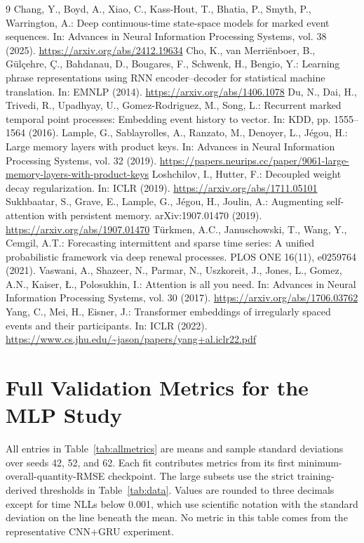 \documentclass[runningheads]{llncs}
\begin{document}
\begin{thebibliography}{9}
Chang, Y., Boyd, A., Xiao, C., Kass-Hout, T., Bhatia, P., Smyth, P., Warrington, A.:
Deep continuous-time state-space models for marked event sequences. In: Advances in Neural Information Processing Systems, vol. 38 (2025).
\url{https://arxiv.org/abs/2412.19634}
Cho, K., van Merri\"enboer, B., G\"ul\c{c}ehre, \c{C}., Bahdanau, D., Bougares, F., Schwenk, H., Bengio, Y.:
Learning phrase representations using RNN encoder--decoder for statistical machine translation. In: EMNLP (2014).
\url{https://arxiv.org/abs/1406.1078}
Du, N., Dai, H., Trivedi, R., Upadhyay, U., Gomez-Rodriguez, M., Song, L.:
Recurrent marked temporal point processes: Embedding event history to vector. In: KDD, pp. 1555--1564 (2016).
Lample, G., Sablayrolles, A., Ranzato, M., Denoyer, L., J\'egou, H.:
Large memory layers with product keys. In: Advances in Neural Information Processing Systems, vol. 32 (2019).
\url{https://papers.neurips.cc/paper/9061-large-memory-layers-with-product-keys}
Loshchilov, I., Hutter, F.: Decoupled weight decay regularization. In: ICLR (2019).
\url{https://arxiv.org/abs/1711.05101}
Sukhbaatar, S., Grave, E., Lample, G., J\'egou, H., Joulin, A.:
Augmenting self-attention with persistent memory. arXiv:1907.01470 (2019).
\url{https://arxiv.org/abs/1907.01470}
T\"urkmen, A.C., Januschowski, T., Wang, Y., Cemgil, A.T.:
Forecasting intermittent and sparse time series: A unified probabilistic framework via deep renewal processes. PLOS ONE 16(11), e0259764 (2021).
Vaswani, A., Shazeer, N., Parmar, N., Uszkoreit, J., Jones, L., Gomez, A.N., Kaiser, \L{}., Polosukhin, I.:
Attention is all you need. In: Advances in Neural Information Processing Systems, vol. 30 (2017).
\url{https://arxiv.org/abs/1706.03762}
Yang, C., Mei, H., Eisner, J.:
Transformer embeddings of irregularly spaced events and their participants. In: ICLR (2022).
\url{https://www.cs.jhu.edu/~jason/papers/yang+al.iclr22.pdf}
\end{thebibliography}

\clearpage
\appendix
\renewcommand{\theHsection}{\Alph{section}}
\section{Full Validation Metrics for the MLP Study}
\label{app:metrics}
All entries in Table~\ref{tab:allmetrics} are means and sample standard deviations over seeds 42, 52, and 62. Each fit contributes metrics from its first minimum-overall-quantity-RMSE checkpoint. The large subsets use the strict training-derived thresholds in Table~\ref{tab:data}. Values are rounded to three decimals except for time NLLs below 0.001, which use scientific notation with the standard deviation on the line beneath the mean. No metric in this table comes from the representative CNN+GRU experiment.
\end{document}

